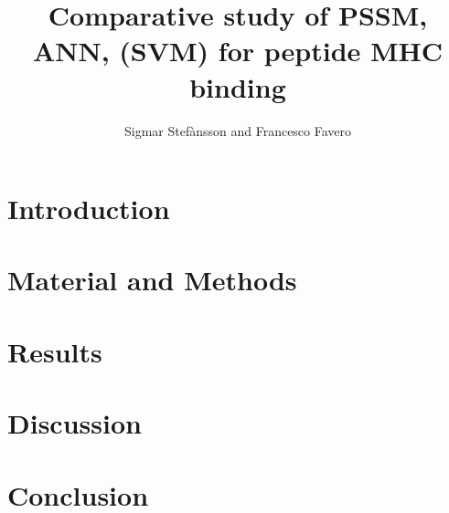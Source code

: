 \documentclass{bioinfo}
\begin{document}
\begin{application}

\title[PSSM,ANN,SVM]{Comparative study of PSSM, ANN, (SVM) for 
peptide MHC binding}
\author[Sigmar Stef\`{a}nsson, Francesco Favero]{Sigmar Stef\`{a}nsson and Francesco Favero}

\address{Danmarks Tekniske Univeristet}



\maketitle

\begin{abstract}

   


\end{abstract}

\section*{Introduction}
   


\section*{Material and Methods}
   


\section*{Results}
   



\section*{Discussion}
   

\section*{Conclusion}
   
\newpage





%
%
%
%
%






\end{application}
\end{document}
